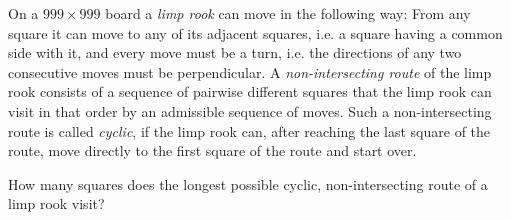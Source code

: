 On a $999 \times 999$ board a \emph{limp rook} can move in the following way: From any square it can move to any of its adjacent squares, i.e. a square having a common side with it, and every move must be a turn, i.e. the directions of any two consecutive moves must be perpendicular. A \emph{non-intersecting route} of the limp rook consists of a sequence of pairwise different squares that the limp rook can visit in that order by an admissible sequence of moves. Such a non-intersecting route is called \emph{cyclic}, if the limp rook can, after reaching the last square of the route, move directly to the first square of the route and start over.

How many squares does the longest possible cyclic, non-intersecting route of a limp rook visit?
